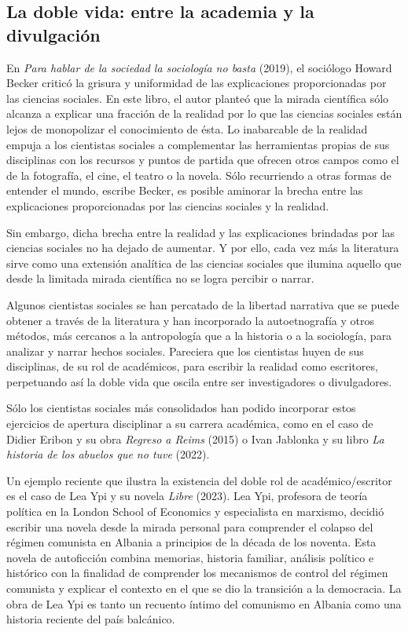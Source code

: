 \documentclass[
]{interact}
\begin{document}
\subsection{La doble vida: entre la academia y la
divulgación}\label{la-doble-vida-entre-la-academia-y-la-divulgaciuxf3n}

En \emph{Para hablar de la sociedad la sociología no basta} (2019), el
sociólogo Howard Becker criticó la grisura y uniformidad de las
explicaciones proporcionadas por las ciencias sociales. En este libro,
el autor planteó que la mirada científica sólo alcanza a explicar una
fracción de la realidad por lo que las ciencias sociales están lejos de
monopolizar el conocimiento de ésta. Lo inabarcable de la realidad
empuja a los cientistas sociales a complementar las herramientas propias
de sus disciplinas con los recursos y puntos de partida que ofrecen
otros campos como el de la fotografía, el cine, el teatro o la novela.
Sólo recurriendo a otras formas de entender el mundo, escribe Becker, es
posible aminorar la brecha entre las explicaciones proporcionadas por
las ciencias sociales y la realidad.

Sin embargo, dicha brecha entre la realidad y las explicaciones
brindadas por las ciencias sociales no ha dejado de aumentar. Y por
ello, cada vez más la literatura sirve como una extensión analítica de
las ciencias sociales que ilumina aquello que desde la limitada mirada
científica no se logra percibir o narrar.

Algunos cientistas sociales se han percatado de la libertad narrativa
que se puede obtener a través de la literatura y han incorporado la
autoetnografía y otros métodos, más cercanos a la antropología que a la
historia o a la sociología, para analizar y narrar hechos sociales.
Pareciera que los cientistas huyen de sus disciplinas, de su rol de
académicos, para escribir la realidad como escritores, perpetuando así
la doble vida que oscila entre ser investigadores o divulgadores.

Sólo los cientistas sociales más consolidados han podido incorporar
estos ejercicios de apertura disciplinar a su carrera académica, como en
el caso de Didier Eribon y su obra \emph{Regreso a Reims} (2015) o Ivan
Jablonka y su libro \emph{La historia de los abuelos que no tuve}
(2022).

Un ejemplo reciente que ilustra la existencia del doble rol de
académico/escritor es el caso de Lea Ypi y su novela \emph{Libre}
(2023). Lea Ypi, profesora de teoría política en la London School of
Economics y especialista en marxismo, decidió escribir una novela desde
la mirada personal para comprender el colapso del régimen comunista en
Albania a principios de la década de los noventa. Esta novela de
autoficción combina memorias, historia familiar, análisis político e
histórico con la finalidad de comprender los mecanismos de control del
régimen comunista y explicar el contexto en el que se dio la transición
a la democracia. La obra de Lea Ypi es tanto un recuento íntimo del
comunismo en Albania como una historia reciente del país balcánico.
\end{document}
